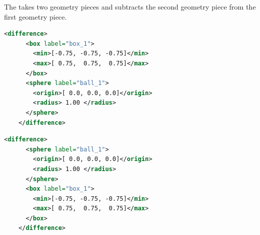 \begin{minipage}{0.6\textwidth}
  The  takes two geometry pieces and subtracts
  the second geometry piece from the first geometry piece.  
  \begin{lstlisting}[language=XML]
    <difference>
      <box label="box_1">
        <min>[-0.75, -0.75, -0.75]</min>
        <max>[ 0.75,  0.75,  0.75]</max>
      </box>
      <sphere label="ball_1">
        <origin>[ 0.0, 0.0, 0.0]</origin>
        <radius> 1.00 </radius>
      </sphere>
    </difference>
  \end{lstlisting}
  \begin{lstlisting}[language=XML]
    <difference>
      <sphere label="ball_1">
        <origin>[ 0.0, 0.0, 0.0]</origin>
        <radius> 1.00 </radius>
      </sphere>
      <box label="box_1">
        <min>[-0.75, -0.75, -0.75]</min>
        <max>[ 0.75,  0.75,  0.75]</max>
      </box>
    </difference>
  \end{lstlisting}
\end{minipage}

